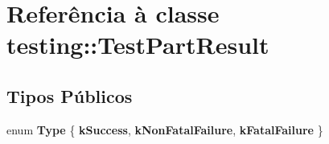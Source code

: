 \hypertarget{classtesting_1_1TestPartResult}{\section{Referência à classe testing\-:\-:Test\-Part\-Result}
\label{classtesting_1_1TestPartResult}
}
\subsection*{Tipos Públicos}
\begin{DoxyCompactItemize}
\item 
enum {\bfseries Type} \{ {\bfseries k\-Success}, 
{\bfseries k\-Non\-Fatal\-Failure}, 
{\bfseries k\-Fatal\-Failure}
 \}
\end{DoxyCompactItemize}

